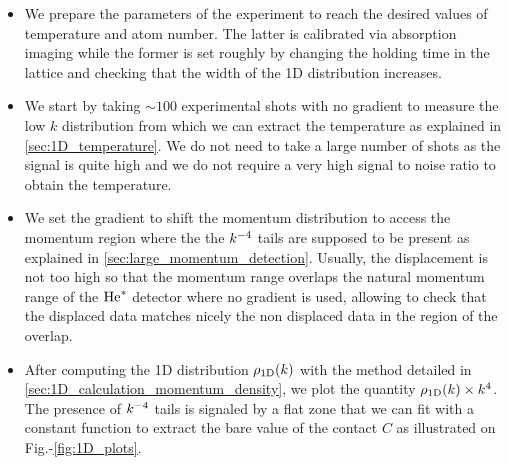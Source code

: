 \begin{itemize}
    \item We prepare the parameters of the experiment to reach the desired values of temperature and atom number. The latter is calibrated via absorption imaging while the former is set roughly by changing the holding time in the lattice and checking that the width of the 1D distribution increases. 
    \item We start by taking $\sim 100$ experimental shots with no gradient to measure the low $k$ distribution from which we can extract the temperature as explained in \ref{sec:1D_temperature}. We do not need to take a large number of shots as the signal is quite high and we do not require a very high signal to noise ratio to obtain the temperature.
    \item We set the gradient to shift the momentum distribution to access the momentum region where the the $k^{-4}$ tails are supposed to be present as explained in \ref{sec:large_momentum_detection}. Usually, the displacement is not too high so that the momentum range overlaps the natural momentum range of the $\mathrm{He}^*$ detector where no gradient is used, allowing to check that the displaced data matches nicely the non displaced data in the region of the overlap. 
    \item After computing the 1D distribution $\rho_{\rm{1D}} (k)$ with the method detailed in \ref{sec:1D_calculation_momentum_density}, we plot the quantity $\rho_{\rm{1D}} (k) \times k^4$. The presence of $k^{-4}$ tails is signaled by a flat zone that we can fit with a constant function to extract the bare value of the contact $C$ as illustrated on Fig.-\ref{fig:1D_plots}.

    
\end{itemize}  
    
